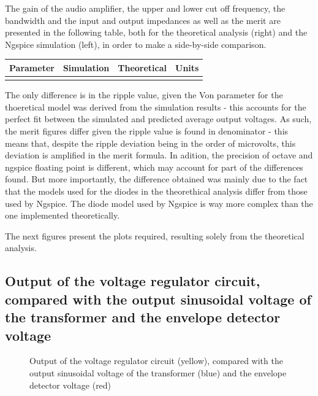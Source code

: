 The gain of the audio amplifier, the upper and lower cut off frequency, the bandwidth and the input and output impedances as well as the merit are presented in the following table, both for the theoretical analysis (right) and the Ngspice simulation (left), in order to make a side-by-side comparison.

\hfill
 \parbox{1\linewidth}{
  \centering
  \begin{tabular}{|l|l|l|r|}
    \hline    
    {\bf Parameter} & {\bf Simulation} & {\bf Theoretical } & {\bf Units }\\ \hline
    
  \label{tab:results}
  \end{tabular}
  }
  
\vspace{2cm}
    The only difference is in the ripple value, given the Von parameter for the thoeretical model was derived from the simulation results - this accounts for the perfect fit between the simulated and predicted average output voltages. As such, the merit figures differ given the ripple value is found in denominator - this means that, despite the ripple deviation being in the order of microvolts, this deviation is amplified in the merit formula. In adition, the precision of octave and ngspice floating point is different, which may account for part of the differences found. But more importantly, the difference obtained was mainly due to the fact that the models
used for the diodes in the theorethical analysis differ from those used by Ngspice. The diode
model used by Ngspice is way more complex than the one implemented theoretically.
  
  The next figures present the plots required, resulting solely from the theoretical analysis.




\subsection{Output of the voltage regulator circuit, compared with the output sinusoidal voltage of the transformer and the envelope detector voltage}

\par
\begin{figure}[H] \centering
\caption{Output of the voltage regulator circuit (yellow), compared with the output sinusoidal voltage of the transformer (blue) and the envelope detector voltage (red)}
\label{fig:all_vout}
\end{figure}


